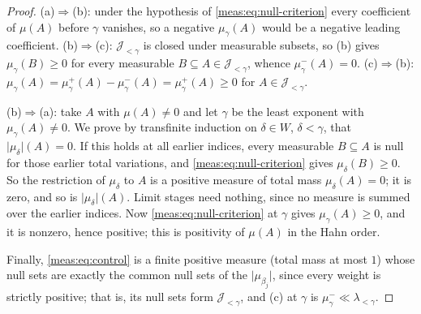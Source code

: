 \documentclass[11pt]{article}
\numberwithin{equation}{section}
\theoremstyle{definition}
\theoremstyle{remark}
\newcommand{\abs}[1]{\lvert#1\rvert}
\begin{document}
\begin{proof}
(a)$\Rightarrow$(b): under the hypothesis of \eqref{meas:eq:null-criterion} every
coefficient of $\mu(A)$ before $\gamma$ vanishes, so a negative $\mu_\gamma(A)$
would be a negative leading coefficient.
(b)$\Rightarrow$(c): $\mathcal J_{<\gamma}$ is closed under measurable subsets, so
(b) gives $\mu_\gamma(B)\ge0$ for every measurable $B\subseteq A\in\mathcal
J_{<\gamma}$, whence $\mu_\gamma^-(A)=0$. (c)$\Rightarrow$(b):
$\mu_\gamma(A)=\mu_\gamma^+(A)-\mu_\gamma^-(A)=\mu_\gamma^+(A)\ge0$ for
$A\in\mathcal J_{<\gamma}$.

(b)$\Rightarrow$(a): take $A$ with $\mu(A)\ne0$ and let $\gamma$ be the least
exponent with $\mu_\gamma(A)\ne0$. We prove by transfinite induction on
$\delta\in W$, $\delta<\gamma$, that $\abs{\mu_\delta}(A)=0$. If this holds at all
earlier indices, every measurable $B\subseteq A$ is null for those earlier total
variations, and \eqref{meas:eq:null-criterion} gives $\mu_\delta(B)\ge0$. So the
restriction of $\mu_\delta$ to $A$ is a positive measure of total mass
$\mu_\delta(A)=0$; it is zero, and so is $\abs{\mu_\delta}(A)$. Limit stages need
nothing, since no measure is summed over the earlier indices. Now
\eqref{meas:eq:null-criterion} at $\gamma$ gives $\mu_\gamma(A)\ge0$, and it is
nonzero, hence positive; this is positivity of $\mu(A)$ in the Hahn order.

Finally, \eqref{meas:eq:control} is a finite positive measure (total mass at most
$1$) whose null sets are exactly the common null sets of the $\abs{\mu_{\beta_j}}$,
since every weight is strictly positive; that is, its null sets form
$\mathcal J_{<\gamma}$, and (c) at $\gamma$ is $\mu_\gamma^-\ll\lambda_{<\gamma}$.
\end{proof}
\end{document}

